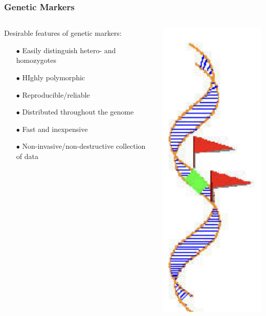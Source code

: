 \documentclass{beamer}
\begin{document}
\begin{frame}
	
	\frametitle{Genetic Markers }
	
	\begin{columns}
		\begin{column}{0.7\textwidth}
Desirable features of genetic markers:
			\begin{itemize}
				\item[$\bullet$] Easily distinguish hetero- and homozygotes
				\item[$\bullet$] HIghly polymorphic
				\item[$\bullet$] Reproducible/reliable 
				\item[$\bullet$] Distributed throughout the genome
				\item[$\bullet$] Fast and inexpensive
				\item[$\bullet$] Non-invasive/non-destructive collection of data
				
			\end{itemize} 
			

			
		\end{column}
		\begin{column}{0.3\textwidth}
			\includegraphics[keepaspectratio, height  = 0.7\textheight]{img/geneticMarker}
		\end{column}
		
	\end{columns}
	
\end{frame}
\end{document}

